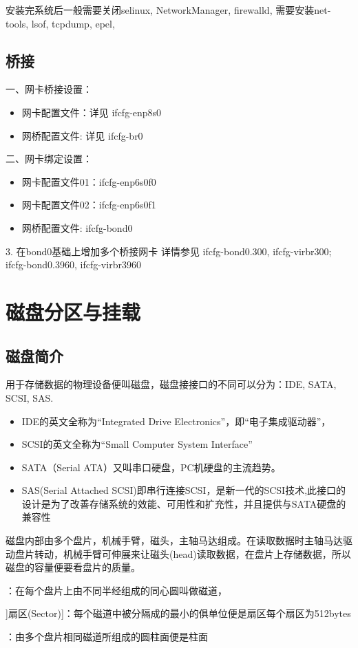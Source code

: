 安装完系统后一般需要关闭selinux, NetworkManager, firewalld, 需要安装net-tools, lsof, tcpdump, epel,

\subsection{桥接}
一、网卡桥接设置：
\begin{itemize}
 \item 网卡配置文件：详见 ifcfg-enp8s0
\item 网桥配置文件: 详见 ifcfg-br0
\end{itemize}

二、网卡绑定设置：
\begin{itemize}
\item 网卡配置文件01：ifcfg-enp6s0f0
\item 网卡配置文件02：ifcfg-enp6s0f1
\item 网桥配置文件: ifcfg-bond0
\end{itemize}

3. 在bond0基础上增加多个桥接网卡
详情参见 ifcfg-bond0.300, ifcfg-virbr300;  ifcfg-bond0.3960, ifcfg-virbr3960

\section{磁盘分区与挂载}

\subsection{磁盘简介}
用于存储数据的物理设备便叫磁盘，磁盘接接口的不同可以分为：IDE,  SATA, SCSI, SAS.

\begin{itemize}
\item IDE的英文全称为“Integrated Drive Electronics”，即“电子集成驱动器”，
\item SCSI的英文全称为“Small Computer System Interface”
\item SATA（Serial ATA）又叫串口硬盘，PC机硬盘的主流趋势。
\item SAS(Serial Attached SCSI)即串行连接SCSI，是新一代的SCSI技术,此接口的设计是为了改善存储系统的效能、可用性和扩充性，并且提供与SATA硬盘的兼容性
\end{itemize}

磁盘内部由多个盘片，机械手臂，磁头，主轴马达组成。在读取数据时主轴马达驱动盘片转动，机械手臂可伸展来让磁头(head)读取数据，在盘片上存储数据，所以磁盘的容量便要看盘片的质量。

\begin{description}
	\item[磁道(Track)]：在每个盘片上由不同半经组成的同心圆叫做磁道，
	\item]扇区(Sector)]：每个磁道中被分隔成的最小的俱单位便是扇区每个扇区为512bytes
	\item[柱面(Cylinder)]：由多个盘片相同磁道所组成的圆柱面便是柱面
\end{description}

